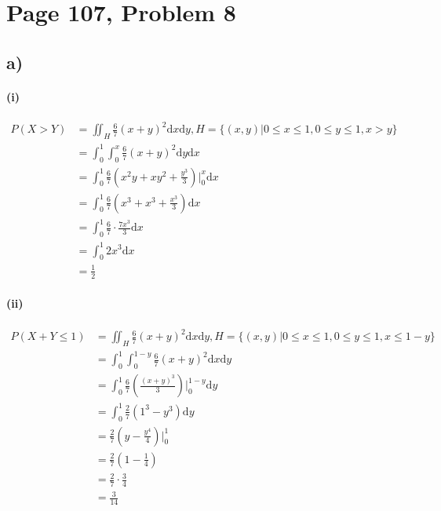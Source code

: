 \documentclass[a4paper, UTF-8]{article}
\theoremstyle{plain}
\begin{document}
\section{Page 107, Problem 8}

\subsection{a)} 

\paragraph{(i)} 

\begin{align*}
P(X > Y) &= \iint_{H} \frac{6}{7}(x + y)^2 \mathrm{d}x \mathrm{d}y, H = \{(x, y) | 0 \leq x \leq 1, 0 \leq y \leq 1, x > y\} \\
         &= \int_{0}^1 \int_{0}^x \frac{6}{7}(x + y)^2 \mathrm{d}y \mathrm{d}x \\
         &= \int_{0}^1 \frac{6}{7} \left(x^2 y + xy^2 + \frac{y^3}{3}\right) \Big|_{0}^{x} \mathrm{d}x \\
         &= \int_{0}^1 \frac{6}{7} \left(x^3 + x^3 + \frac{x^3}{3}\right) \mathrm{d}x \\
         &= \int_{0}^1 \frac{6}{7} \cdot \frac{7x^3}{3} \mathrm{d}x \\
         &= \int_{0}^1 2x^3 \mathrm{d}x \\
         &= \frac{1}{2}
\end{align*}

\paragraph{(ii)} 
\begin{align*}
P(X + Y \leq 1) &= \iint_{H} \frac{6}{7}(x + y)^2 \mathrm{d}x \mathrm{d}y, H = \{(x, y) | 0 \leq x \leq 1, 0 \leq y \leq 1, x \leq 1 - y\}\\ 
&= \int_{0}^1 \int_{0}^{1-y} \frac{6}{7}(x + y)^2 \mathrm{d}x \mathrm{d}y\\
&= \int_{0}^1 \frac{6}{7} \left( \frac{(x+y)^3}{3} \right) \Big|_{0}^{1-y} \mathrm{d}y\\
&= \int_{0}^1 \frac{2}{7} \left( 1^3 - y^3 \right) \mathrm{d}y\\
&= \frac{2}{7} \left( y - \frac{y^4}{4} \right) \Big|_{0}^1\\
&= \frac{2}{7} \left( 1 - \frac{1}{4} \right)\\
&= \frac{2}{7} \cdot \frac{3}{4}\\
&= \frac{3}{14}
\end{align*}
\end{document}
